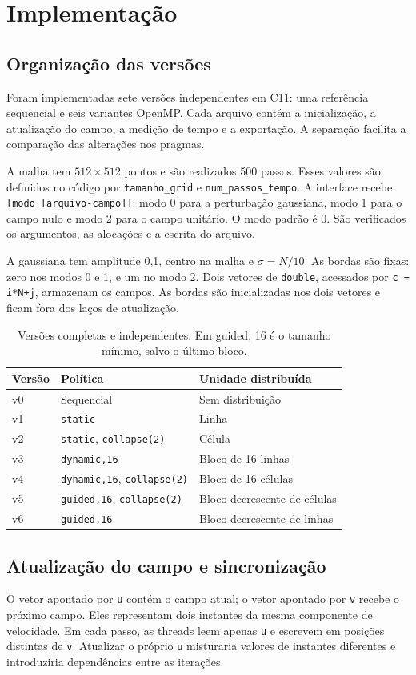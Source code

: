 \documentclass[11pt,letterpaper]{article}
\begin{document}
\section{Implementação}
\subsection{Organização das versões}
Foram implementadas sete versões independentes em C11: uma referência sequencial e seis variantes OpenMP. Cada arquivo contém a inicialização, a atualização do campo, a medição de tempo e a exportação. A separação facilita a comparação das alterações nos pragmas.

A malha tem $512\times512$ pontos e são realizados 500 passos. Esses valores são definidos no código por \texttt{tamanho\_grid} e \texttt{num\_passos\_tempo}. A interface recebe \texttt{[modo [arquivo-campo]]}: modo 0 para a perturbação gaussiana, modo 1 para o campo nulo e modo 2 para o campo unitário. O modo padrão é 0. São verificados os argumentos, as alocações e a escrita do arquivo.

A gaussiana tem amplitude 0,1, centro na malha e $\sigma=N/10$. As bordas são fixas: zero nos modos 0 e 1, e um no modo 2. Dois vetores de \texttt{double}, acessados por \texttt{c = i*N+j}, armazenam os campos. As bordas são inicializadas nos dois vetores e ficam fora dos laços de atualização.

\begin{table}[H]
\centering
\begin{tabular}{lll}
\hline
Versão & Política & Unidade distribuída \\
\hline
v0 & Sequencial & Sem distribuição \\
v1 & \texttt{static} & Linha \\
v2 & \texttt{static}, \texttt{collapse(2)} & Célula \\
v3 & \texttt{dynamic,16} & Bloco de 16 linhas \\
v4 & \texttt{dynamic,16}, \texttt{collapse(2)} & Bloco de 16 células \\
v5 & \texttt{guided,16}, \texttt{collapse(2)} & Bloco decrescente de células \\
v6 & \texttt{guided,16} & Bloco decrescente de linhas \\
\hline
\end{tabular}
\caption{Versões completas e independentes. Em guided, 16 é o tamanho mínimo, salvo o último bloco.}
\end{table}
\subsection{Atualização do campo e sincronização}
O vetor apontado por \texttt{u} contém o campo atual; o vetor apontado por \texttt{v} recebe o próximo campo. Eles representam dois instantes da mesma componente de velocidade. Em cada passo, as threads leem apenas \texttt{u} e escrevem em posições distintas de \texttt{v}. Atualizar o próprio \texttt{u} misturaria valores de instantes diferentes e introduziria dependências entre as iterações.
\end{document}
